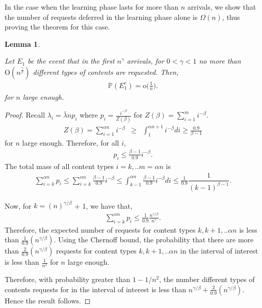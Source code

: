 \documentclass[10pt, conference, letterpaper]{IEEEtran}
\newtheorem{lemma}{Lemma}
\def \OO {\mathrm{O}}
\def \oo {\mathrm{o}}
\begin{document}
In the case when the learning phase lasts for more than $n$ arrivals, we show that the number of requests deferred in the learning phase alone is $\Omega(n)$, thus proving the theorem for this case.

\begin{lemma}
	\label{lemma:E_1}
	
	Let $E_1$ be the event that in the first $n^{\gamma}$ arrivals, for $0 < \gamma < 1$ no more than $\OO(n^{\frac{\gamma}{\beta}})$ different types of contents are requested. Then,
	\begin{eqnarray}
	\label{eq:E_1}
	\mathbb{P}(E_1^c) = \oo\bigg(\frac{1}{n}\bigg).
	\end{eqnarray}
	for $n$ large enough.
\end{lemma}
\begin{proof}
	Recall $\lambda_i = \bar{\lambda}n p_i$ where $p_i = \frac{i^{-\beta}}{Z(\beta)}$ for $Z(\beta) = \sum_{i=1}^m i^{-\beta}$.
	\begin{eqnarray*}
		Z(\beta) = \sum_{i=1}^{\alpha n} i^{-\beta} &\geq& \int_{1}^{\alpha n+1} i^{-\beta} di
\geq \frac{0.9}{\beta-1}
	\end{eqnarray*}
	for $n$ large enough.
	Therefore, for all $i$,
	\begin{eqnarray*}
		p_i \leq \frac{\beta-1}{0.9} i^{-\beta}.
	\end{eqnarray*}
	The total mass of all content types $i = k, .. m = \alpha n$ is
	\begin{eqnarray*}
		\sum_{i=k}^{\alpha n} p_i \leq \sum_{i=k}^{\alpha n} \frac{\beta-1}{0.9} i^{-\beta}
		\leq \int_{k-1}^{\alpha n} \frac{\beta-1}{0.9} i^{-\beta} di
\leq \frac{1}{0.9} \dfrac{1}{(k-1)^{\beta-1}}.
	\end{eqnarray*}
	
	Now, for $k = (n)^{\gamma/\beta}$ + 1, we have that,
	\begin{eqnarray*}
		\sum_{i=k}^{\alpha n} p_i  \leq \frac{1}{0.9} \frac{n^{\gamma/\beta}}{n^{\gamma}}.
	\end{eqnarray*}
	Therefore, the expected number of requests for content types $k, k+1, .. \alpha n$ is less than $\frac{1}{0.9} (n^{\gamma/\beta})$. Using the Chernoff bound, the probability that there are more than $\frac{2}{0.9} (n^{\gamma/\beta})$ requests for content types $k, k+1, .. \alpha n$ in the interval of interest is less than $ \frac{1}{n^2}$ for $n$ large enough.
	
	Therefore, with probability greater than $ 1-1/n^2$, the number different types of contents requests for in the interval of interest is less than $ n^{\gamma/\beta} + \frac{2}{0.9} (n^{\gamma/\beta})$. Hence the result follows.
\end{proof}
\end{document}
